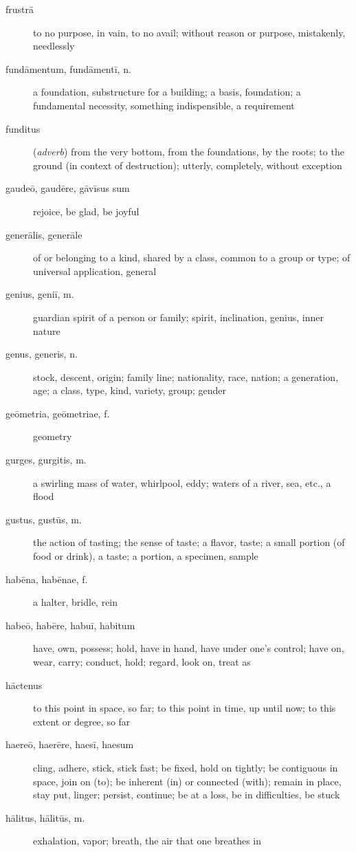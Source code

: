 \begin{description}
    \item[frustrā] \marginnote{*}to no purpose, in vain, to no avail; without reason or purpose, mistakenly, needlessly
    \item[fundāmentum, fundāmentī, n.] a foundation, substructure for a building; a basis, foundation; a fundamental necessity, something indispensible, a requirement
    \item[funditus] (\textit{adverb}) from the very bottom, from the foundations, by the roots; to the ground (in context of destruction); utterly, completely, without exception
    \item[gaudeō, gaudēre, gāvīsus sum] \marginnote{*}rejoice, be glad, be joyful
    \item[generālis, generāle] of or belonging to a kind, shared by a class, common to a group or type; of universal application, general
    \item[genius, geniī, m.] guardian spirit of a person or family; spirit, inclination, genius, inner nature
    \item[genus, generis, n.] \marginnote{*}stock, descent, origin; family line; nationality, race, nation; a generation, age; a class, type, kind, variety, group; gender
    \item[geōmetria, geōmetriae, f.] geometry
    \item[gurges, gurgitis, m.] a swirling mass of water, whirlpool, eddy; waters of a river, sea, etc., a flood
    \item[gustus, gustūs, m.] the action of tasting; the sense of taste; a flavor, taste; a small portion (of food or drink), a taste; a portion, a specimen, sample
    \item[habēna, habēnae, f.] a halter, bridle, rein
    \item[habeō, habēre, habuī, habitum] \marginnote{*}have, own, possess; hold, have in hand, have under one's control; have on, wear, carry; conduct, hold; regard, look on, treat as
    \item[hāctenus] to this point in space, so far; to this point in time, up until now; to this extent or degree, so far
    \item[haereō, haerēre, haesī, haesum] cling, adhere, stick, stick fast; be fixed, hold on tightly; be contiguous in space, join on (to); be inherent (in) or connected (with); remain in place, stay put, linger; persist, continue; be at a loss, be in difficulties, be stuck
    \item[hālitus, hālitūs, m.] exhalation, vapor; breath, the air that one breathes in

\end{description}
